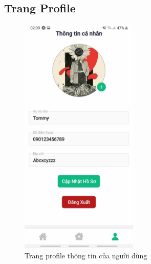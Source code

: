 \subsection{Trang Profile}
\begin{figure}[H]
    \centering
    \includegraphics[width=0.5\textwidth]{Images/app_image/app_4.jpg}
    \caption{Trang profile thông tin của người dùng}
\end{figure}
